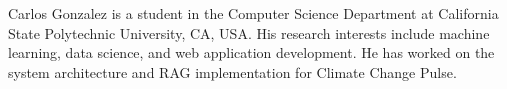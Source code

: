 \documentclass{ieeeaccess}
\begin{document}
\begin{IEEEbiographynophoto}{Carlos Gonzalez} is a student in the Computer Science Department at California State Polytechnic University, CA, USA. His research interests include machine learning, data science, and web application development. He has worked on the system architecture and RAG implementation for Climate Change Pulse.
\end{IEEEbiographynophoto}

\EOD
\end{document}
